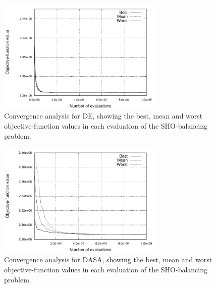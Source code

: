 \begin{figure}[h]
\centering

\includegraphics[width=0.7\textwidth]{07-experimental_evaluation-sho_balancing/img/DE_convergence}

\caption{Convergence analysis for DE, showing the best, mean and worst objective-function
values in each evaluation of the SHO-balancing problem.\label{fig:07-Algorithm_convergence-DE}}
\end{figure}


\begin{figure}[h]
\centering

\includegraphics[width=0.7\textwidth]{07-experimental_evaluation-sho_balancing/img/DASA_convergence}

\caption{Convergence analysis for DASA, showing the best, mean and worst objective-function
values in each evaluation of the SHO-balancing problem.\label{fig:07-Algorithm_convergence-DASA}}
\end{figure}


